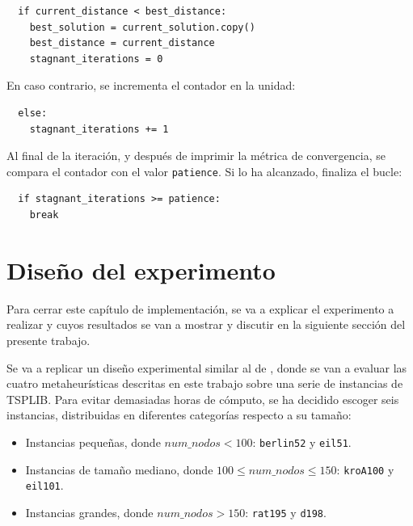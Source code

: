\begin{verbatim}
  if current_distance < best_distance:
    best_solution = current_solution.copy()
    best_distance = current_distance
    stagnant_iterations = 0
\end{verbatim}

En caso contrario, se incrementa el contador en la unidad:

\begin{verbatim}
  else:
    stagnant_iterations += 1
\end{verbatim}

Al final de la iteración, y después de imprimir la métrica de convergencia, se compara el contador con el valor 
\texttt{patience}. Si lo ha alcanzado, finaliza el bucle:

\begin{verbatim}
  if stagnant_iterations >= patience:   
    break
\end{verbatim}

\section{Diseño del experimento}
\label{sec:exp_design}

Para cerrar este capítulo de implementación, se va a explicar el experimento a realizar y cuyos resultados se van a mostrar
y discutir en la siguiente sección del presente trabajo.

Se va a replicar un diseño experimental similar al de \cite{halim2019}, donde se van a evaluar las cuatro metaheurísticas 
descritas en este trabajo sobre una serie de instancias de TSPLIB. Para evitar demasiadas horas de cómputo, se ha decidido
escoger seis instancias, distribuidas en diferentes categorías respecto a su tamaño:
\begin{itemize}
  \item Instancias pequeñas, donde $num\_nodos < 100$: \texttt{berlin52} y \texttt{eil51}.
  \item Instancias de tamaño mediano, donde $100 \leq num\_nodos \leq 150$: \texttt{kroA100} y \texttt{eil101}.
  \item Instancias grandes, donde $num\_nodos > 150$: \texttt{rat195} y \texttt{d198}.
\end{itemize}




